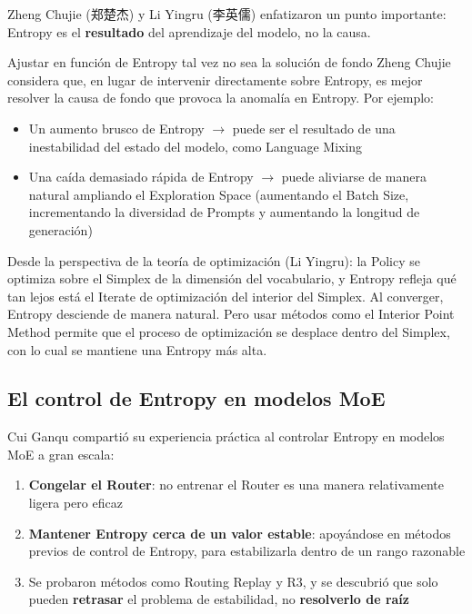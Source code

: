 \documentclass[a4paper]{article}
\begin{document}
Zheng Chujie (郑楚杰) y Li Yingru (李英儒) enfatizaron un punto importante: Entropy es el \textbf{resultado} del aprendizaje del modelo, no la causa.

\begin{knowledgebox}{Ajustar en función de Entropy tal vez no sea la solución de fondo}
Zheng Chujie considera que, en lugar de intervenir directamente sobre Entropy, es mejor resolver la causa de fondo que provoca la anomalía en Entropy. Por ejemplo:
\begin{itemize}
    \item Un aumento brusco de Entropy $\rightarrow$ puede ser el resultado de una inestabilidad del estado del modelo, como Language Mixing
    \item Una caída demasiado rápida de Entropy $\rightarrow$ puede aliviarse de manera natural ampliando el Exploration Space (aumentando el Batch Size, incrementando la diversidad de Prompts y aumentando la longitud de generación)
\end{itemize}
Desde la perspectiva de la teoría de optimización (Li Yingru): la Policy se optimiza sobre el Simplex de la dimensión del vocabulario, y Entropy refleja qué tan lejos está el Iterate de optimización del interior del Simplex. Al converger, Entropy desciende de manera natural. Pero usar métodos como el Interior Point Method permite que el proceso de optimización se desplace dentro del Simplex, con lo cual se mantiene una Entropy más alta.
\end{knowledgebox}

\subsection{El control de Entropy en modelos MoE}

Cui Ganqu compartió su experiencia práctica al controlar Entropy en modelos MoE a gran escala:

\begin{enumerate}
    \item \textbf{Congelar el Router}: no entrenar el Router es una manera relativamente ligera pero eficaz
    \item \textbf{Mantener Entropy cerca de un valor estable}: apoyándose en métodos previos de control de Entropy, para estabilizarla dentro de un rango razonable
    \item Se probaron métodos como Routing Replay y R3, y se descubrió que solo pueden \textbf{retrasar} el problema de estabilidad, no \textbf{resolverlo de raíz}
\end{enumerate}
\end{document}
